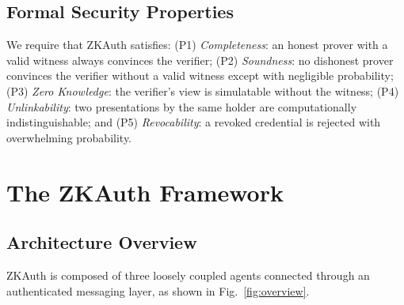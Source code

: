 \documentclass[journal,12pt,onecolumn]{IEEEtran}
\begin{document}
\subsection{Formal Security Properties}

We require that ZKAuth satisfies: (P1) \emph{Completeness}: an honest
prover with a valid witness always convinces the verifier; (P2)
\emph{Soundness}: no dishonest prover convinces the verifier without a
valid witness except with negligible probability; (P3) \emph{Zero
Knowledge}: the verifier's view is simulatable without the witness; (P4)
\emph{Unlinkability}: two presentations by the same holder are
computationally indistinguishable; and (P5) \emph{Revocability}: a
revoked credential is rejected with overwhelming probability.

\section{The ZKAuth Framework}
\label{sec:framework}

\subsection{Architecture Overview}

ZKAuth is composed of three loosely coupled agents connected through an
authenticated messaging layer, as shown in Fig.~\ref{fig:overview}.
\end{document}
